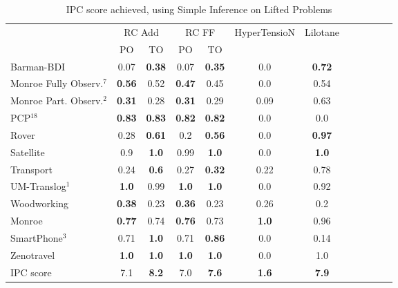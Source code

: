 \documentclass[letterpaper]{article} %
\begin{document}
\begin{table}
	\centering
	\caption{IPC score achieved, using Simple Inference on Lifted Problems}
	\label{table:LiftedSimpleIPC}
	\scalebox{0.7} {
\begin{tabular}{lccccccccccl} 
	\toprule 
	& \multicolumn{2}{c}{RC Add} & \multicolumn{2}{c}{RC FF} & HyperTensioN & Lilotane \\ 
	\cmidrule(lr){2-3} \cmidrule(lr){4-5} 
	&PO & TO & PO & TO  \\  
	\midrule 
	Barman-BDI & 0.07 & \textbf{0.38} & 0.07 & \textbf{0.35} & 0.0 & \textbf{0.72}  \\ 


	Monroe Fully Observ.$^{7}$ & \textbf{0.56} & 0.52 & \textbf{0.47} & 0.45 & 0.0 & 0.54   \\ 
	Monroe Part. Observ.$^{2}$ & \textbf{0.31} & 0.28 & \textbf{0.31} & 0.29 & 0.09 & 0.63   \\ 
	PCP$^{18}$ & \textbf{0.83} & \textbf{0.83} & \textbf{0.82} & \textbf{0.82} & 0.0 & 0.0   \\ 
	Rover & 0.28 & \textbf{0.61} & 0.2 & \textbf{0.56} & 0.0 & \textbf{0.97}  \\ 
	Satellite & 0.9 & \textbf{1.0} & 0.99 & \textbf{1.0} & 0.0 & \textbf{1.0}   \\ 
	Transport & 0.24 & \textbf{0.6} & 0.27 & \textbf{0.32} & 0.22 & 0.78   \\ 
	UM-Translog$^{1}$ & \textbf{1.0} & 0.99 & \textbf{1.0} & \textbf{1.0} & 0.0 & 0.92   \\ 
	Woodworking & \textbf{0.38} & 0.23 & \textbf{0.36} & 0.23 & 0.26 & 0.2  \\ 
	\midrule 
	Monroe & \textbf{0.77} & 0.74 & \textbf{0.76} & 0.73 & \textbf{1.0} & 0.96  \\ 
	SmartPhone$^{3}$ & 0.71 & \textbf{1.0} & 0.71 & \textbf{0.86} & 0.0 & 0.14   \\ 
	Zenotravel & \textbf{1.0} & \textbf{1.0} & \textbf{1.0} & \textbf{1.0} & 0.0 & 1.0   \\ 
	\midrule 
	IPC score & 7.1 & \textbf{8.2} & 7.0 & \textbf{7.6} & \textbf{1.6} & \textbf{7.9}   \\ 
	\bottomrule 
\end{tabular} 
	}
\end{table} 
\end{document}
